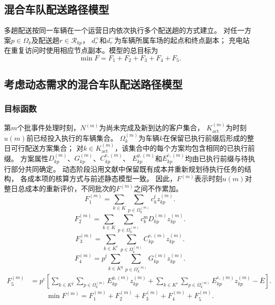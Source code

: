 \documentclass{setp-new}
\begin{document}
\subsection{混合车队配送路径模型}

多趟配送按同一车辆在一个运营日内依次执行多个配送趟的方式建立\cite{ref:44}。
对任一方案$p\in\Omega_k$及配送趟$r\in\mathcal R_{kp}$，
$d_r^{+}$和$d_r^{-}$为车辆所属车场的起点和终点副本；
充电站在重复访问时使用相应节点副本。模型的总目标为
\begin{equation}
\min F=F_1+F_2+F_3+F_4+F_5.
\label{eq:unified-objective}
\end{equation}

\subsection{考虑动态需求的混合车队配送路径模型}

\subsubsection{目标函数}

第$m$个批事件处理时刻，$N^{(m)}$为尚未完成及新到达的客户集合，
$K_{\mathrm{act}}^{(m)}$为时刻$u(m)$前已经投入执行的车辆集合。
$\Omega_k^{(m)}$为车辆$k$在保留已执行前缀后形成的整日可行配送方案集合；
对$k\in K_{\mathrm{act}}^{(m)}$，该集合中的每个方案均包含相同的已执行前缀。
方案属性$D_{kp}^{(m)}$、$G_{kp}^{(m)}$、$C_{kp}^{\mathrm e,(m)}$、
$E_{kp}^{g,(m)}$和$E_{kp}^{e,(m)}$均由已执行前缀与待执行部分共同确定。
动态阶段沿用文献\cite{ref:71}中保留既有成本并重新规划待执行任务的结构，
各成本项的核算方式与前述静态模型一致。
因此，$F^{(m)}$表示时刻$u(m)$对整日总成本的重新评价，不同批次的$F^{(m)}$之间不作累加。
\begin{equation}
F_1^{(m)}
=\sum_{k\in K}\sum_{p\in\Omega_k^{(m)}}c_k^{\mathrm f}z_{kp}^{(m)}.
\label{eq:unified-dynamic-f1}
\end{equation}
\begin{equation}
F_2^{(m)}
=\sum_{k\in K}\sum_{p\in\Omega_k^{(m)}}c_k^{\mathrm m}D_{kp}^{(m)}z_{kp}^{(m)}.
\label{eq:unified-dynamic-f2}
\end{equation}
\begin{equation}
F_3^{(m)}
=\sum_{k\in K^{e}}\sum_{p\in\Omega_k^{(m)}}C_{kp}^{\mathrm e,(m)}z_{kp}^{(m)}.
\label{eq:unified-dynamic-f3}
\end{equation}
\begin{equation}
F_4^{(m)}
=p^{\mathrm f}\sum_{k\in K^{g}}\sum_{p\in\Omega_k^{(m)}}G_{kp}^{(m)}z_{kp}^{(m)}.
\label{eq:unified-dynamic-f4}
\end{equation}
\begin{equation}
\begin{aligned}
F_5^{(m)}
&=p^{\mathrm c}\left[
\sum_{k\in K^{g}}\sum_{p\in\Omega_k^{(m)}}E_{kp}^{g,(m)}z_{kp}^{(m)}
+\sum_{k\in K^{e}}\sum_{p\in\Omega_k^{(m)}}E_{kp}^{e,(m)}z_{kp}^{(m)}
-\overline E
\right].
\end{aligned}
\label{eq:unified-dynamic-f5}
\end{equation}
\begin{equation}
\min F^{(m)}
=F_1^{(m)}+F_2^{(m)}+F_3^{(m)}+F_4^{(m)}+F_5^{(m)}.
\label{eq:unified-dynamic-objective}
\end{equation}
\end{document}
